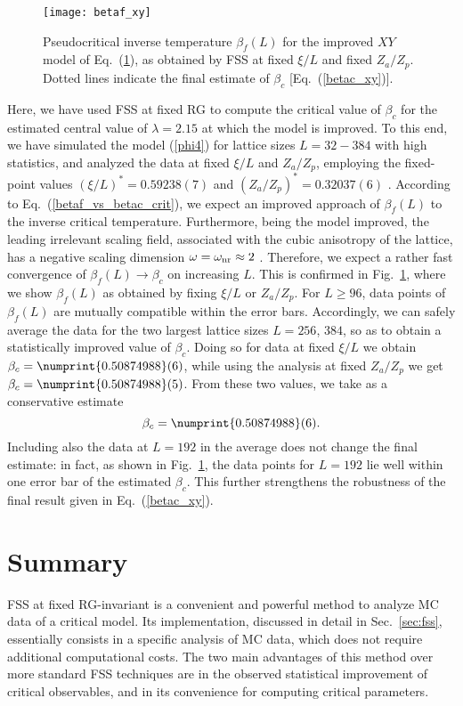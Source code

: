 \documentclass[pre,twocolumn]{revtex4-2}
\begin{document}
\begin{figure}
  \centering
  \texttt{[image: betaf\_xy]}
  \caption{Pseudocritical inverse temperature $\beta_f(L)$ for the improved $XY$ model of Eq.~(\ref{betaf_xy}), as obtained by FSS at fixed $\xi/L$ and fixed $Z_a/Z_p$.
    Dotted lines indicate the final estimate of $\beta_c$ [Eq.~(\ref{betac_xy})].}
  \label{betaf_xy}
\end{figure}
Here, we have used FSS at fixed RG to compute the critical value of $\beta_c$ for the estimated central value of $\lambda=2.15$ at which the model is improved.
To this end, we have simulated the model (\ref{phi4}) for lattice sizes $L=32-384$ with high statistics, and analyzed the data at fixed $\xi/L$ and $Z_a / Z_p$, employing the fixed-point values $(\xi/L)^*=0.59238(7)$ and $(Z_a/Z_p)^*=0.32037(6)$ \cite{Hasenbusch-19}.
According to Eq.~(\ref{betaf_vs_betac_crit}), we expect an improved approach of $\beta_f(L)$ to the inverse critical temperature.
Furthermore, being the model improved, the leading irrelevant scaling field, associated with the cubic anisotropy of the lattice, has a negative scaling dimension $\omega=\omega_{\rm nr}\approx 2$ \cite{Hasenbusch-19}.
Therefore, we expect a rather fast convergence of $\beta_f(L) \rightarrow \beta_c$ on increasing $L$.
This is confirmed in Fig.~\ref{betaf_xy}, where we show $\beta_f(L)$ as obtained by fixing $\xi/L$ or $Z_a/Z_p$.
For $L\ge 96$, data points of $\beta_f(L)$ are mutually compatible within the error bars.
Accordingly, we can safely average the data for the two largest lattice sizes $L=256$, $384$, so as to obtain a statistically improved value of $\beta_c$.
Doing so for data at fixed $\xi/L$ we obtain $\beta_c=\numprint{0.50874988}(6)$, while using the analysis at fixed $Z_a/Z_p$ we get $\beta_c=\numprint{0.50874988}(5)$.
From these two values, we take as a conservative estimate
\begin{equation}
  \beta_c=\numprint{0.50874988}(6).
  \label{betac_xy}
\end{equation}
Including also the data at $L=192$ in the average does not change the final estimate: in fact, as shown in Fig.~\ref{betaf_xy}, the data points for $L=192$ lie well within one error bar of the estimated $\beta_c$.
This further strengthens the robustness of the final result given in Eq.~(\ref{betac_xy}).


\section{Summary}
\label{sec:summary}
FSS at fixed RG-invariant is a convenient and powerful method to analyze MC data of a critical model.
Its implementation, discussed in detail in Sec.~\ref{sec:fss}, essentially consists in a specific analysis of MC data, which does not require additional computational costs.
The two main advantages of this method over more standard FSS techniques are in the observed statistical improvement of critical observables, and in its convenience for computing critical parameters.
\end{document}
